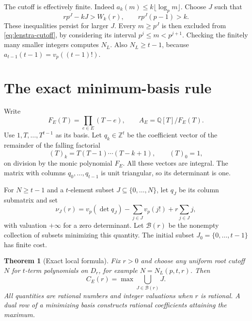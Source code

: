 \documentclass[11pt,letterpaper]{article}
\newtheorem{theorem}{Theorem}[section]
\theoremstyle{definition}\newtheorem{definition}[theorem]{Definition}
\theoremstyle{remark}\newtheorem{remark}[theorem]{Remark}
\newcommand{\Q}{\mathbb Q}
\newcommand{\Z}{\mathbb Z}
\newcommand{\vp}{v_p}
\begin{document}
The cutoff is effectively finite. Indeed
$a_k(m)\le k\lfloor\log_p m\rfloor$. Choose $J$ such that
\[
 rp^J-kJ>W_k(r),\qquad rp^J(p-1)>k.
\]
These inequalities persist for larger $J$. Every $m\ge p^J$ is then
excluded from \eqref{eq:lenstra-cutoff}, by considering its interval
$p^j\le m<p^{j+1}$. Checking the finitely many smaller integers computes
$N_L$. Also $N_L\ge t-1$, because $a_{t-1}(t-1)=\vp((t-1)!)$.

\section{The exact minimum-basis rule}
Write
\[
 F_E(T)=\prod_{e\in E}(T-e),\qquad
 A_E=\Q[T]/F_E(T).
\]
Use $1,T,\ldots,T^{t-1}$ as its basis. Let $q_k\in\Z^t$ be the
coefficient vector of the remainder of the falling factorial
\[
 (T)_k=T(T-1)\cdots(T-k+1),\qquad (T)_0=1,
\]
on division by the monic polynomial $F_E$. All these vectors are
integral. The matrix with columns $q_0,\ldots,q_{t-1}$ is unit
triangular, so its determinant is one.

For $N\ge t-1$ and a $t$-element subset $J\subseteq\{0,\ldots,N\}$,
let $q_J$ be its column submatrix and set
\begin{equation}\label{eq:basis-cost}
 \nu_J(r)=\vp(\det q_J)-\sum_{j\in J}\vp(j!)+r\sum_{j\in J}j,
\end{equation}
with valuation $+\infty$ for a zero determinant. Let
$\mathcal B(r)$ be the nonempty collection of subsets minimizing this
quantity. The initial subset $J_0=\{0,\ldots,t-1\}$ has finite cost.

\begin{theorem}[Exact local formula]\label{thm:exact}
Fix $r>0$ and choose any uniform root cutoff $N$ for $t$-term
polynomials on $D_r$, for example $N=N_L(p,t,r)$. Then
\begin{equation}\label{eq:exact}
             C_E(r)=\max\bigcup_{J\in\mathcal B(r)}J.
\end{equation}
All quantities are rational numbers and integer valuations when $r$ is
rational. A dual row of a minimizing basis constructs rational
coefficients attaining the maximum.
\end{theorem}
\end{document}
